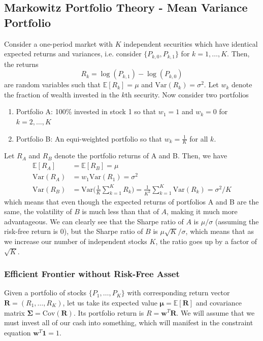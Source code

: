 \documentclass{article}
\begin{document}
\subsection{Markowitz Portfolio Theory - Mean Variance Portfolio}

Consider a one-period market with $K$ independent securities which have identical expected returns and variances, i.e. consider $\{P_{k, 0}, P_{k, 1}\}$ for $k = 1, \ldots, K$. Then, the returns 
\[R_k = \log(P_{k, 1}) - \log(P_{k, 0})\]
are random variables such that $\mathbb{E}[R_k] = \mu$ and $\mathrm{Var}(R_k) = \sigma^2$. Let $w_k$ denote the fraction of wealth invested in the $k$th security. Now consider two portfolios 
\begin{enumerate}
    \item Portfolio A: 100\% invested in stock 1 so that $w_1 = 1$ and $w_k  = 0$ for $k = 2, \ldots, K$ 
    \item Portfolio B: An equi-weighted portfolio so that $w_k = \frac{1}{K}$ for all $k$. 
\end{enumerate}
Let $R_A$ and $R_B$ denote the portfolio returns of A and B. Then, we have 
\begin{align*}
    \mathbb{E}[R_A] & = \mathbb{E}[R_B] = \mu \\
    \mathrm{Var}(R_A) & = w_1 \mathrm{Var}(R_1) = \sigma^2 \\
    \mathrm{Var}(R_B) & = \mathrm{Var} \bigg( \frac{1}{K} \sum_{k=1}^K R_k \bigg) = \frac{1}{K^2} \sum_{k=1}^K \mathrm{Var}(R_k) = \sigma^2 / K
\end{align*}
which means that even though the expected returns of portfolios A and B are the same, the volatility of $B$ is much less than that of $A$, making it much more advantageous. We can clearly see that the Sharpe ratio of $A$ is $\mu / \sigma$ (assuming the risk-free return is $0$), but the Sharpe ratio of $B$ is $\mu \sqrt{K}/ \sigma$, which means that as we increase our number of independent stocks $K$, the ratio goes up by a factor of $\sqrt{K}$. 

\subsubsection{Efficient Frontier without Risk-Free Asset}

Given a portfolio of stocks $\{P_1, \ldots, P_K\}$ with corresponding return vector $\mathbf{R} = (R_1, \ldots, R_K)$, let us take its expected value $\boldsymbol{\mu} = \mathbb{E}[\mathbf{R}]$ and covariance matrix $\boldsymbol{\Sigma} = \mathrm{Cov}(\mathbf{R})$. Its portfolio return is $R = \mathbf{w}^T \mathbf{R}$. We will assume that we must invest all of our cash into something, which will manifest in the constraint equation $\mathbf{w}^T \mathbf{1} = 1$. 
\end{document}

